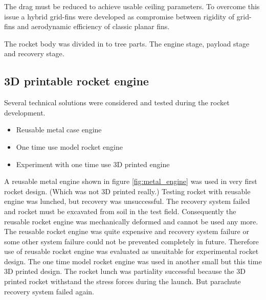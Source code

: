 \documentclass{poster16}
\begin{document}
The drag must be reduced to achieve usable ceiling parameters. To overcome this issue a hybrid grid-fins were developed as compromise between rigidity of grid-fins and aerodynamic efficiency of classic planar fins. 

The rocket body was divided in to tree parts. The engine stage, payload stage and recovery stage. 


\subsection{3D printable rocket engine}

Several technical solutions were considered and tested during the rocket development. 

\begin{itemize}
\item Reusable metal case engine
\item One time use model rocket engine
\item Experiment with one time use 3D printed engine
\end{itemize}

A reusable metal engine shown in figure \ref{fig:metal_engine} was used in very first rocket design. (Which was not 3D printed really.) Testing rocket with reusable engine was lunched, but recovery was unsuccessful. The recovery system failed and rocket must be excavated from soil in the test field. Consequently the reusable rocket engine was mechanically deformed and cannot be used any more.
The reusable rocket engine was quite expensive and recovery system failure or some other system failure could not be prevented completely in future. Therefore use of reusable rocket engine was evaluated as unsuitable for experimental rocket design. 
The one time model rocket engine was used in another small but this time 3D printed design. The rocket lunch was partiality successful because the 3D printed rocket withstand the stress forces during the launch.  But parachute recovery system failed again. 
\end{document}
